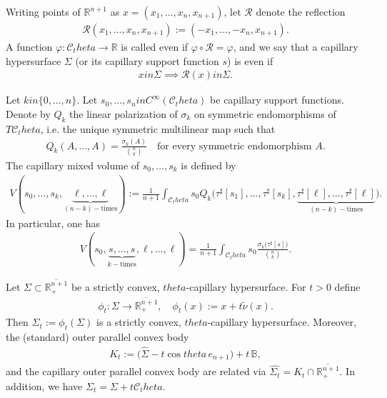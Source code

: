 \documentclass[12pt]{amsart}
\def\theta{theta}%
\def\in{in }%
\numberwithin{equation}{section}
\newcommand{\wh}{\widehat}
\newcommand{\ov}{\overline}
\newcommand{\bbR}{\mathbb{R}}
\newcommand{\bbB}{\mathbb{B}}
\newcommand{\Rn}{\mathbb{R}^{n+1}}
\newcommand{\8}{\infty}
\newcommand{\Si}{\Sigma}
\newcommand{\cC}{\mathcal{C}}
\newcommand{\cR}{\mathcal{R}}
\newcommand{\eq}[1]{\begin{equation}\begin{alignedat}{2}#1\end{alignedat}\end{equation}}
\newcommand{\Cth}{\cC_\theta}
\begin{document}
Writing points of $\Rn$ as $x=(x_1,\dots,x_n,x_{n+1})$, let $\cR$ denote the reflection
\eq{
  \cR(x_1,\dots,x_n,x_{n+1})
  := (-x_1,\dots,-x_n,x_{n+1}).
}
A function $\varphi:\Cth\to\bbR$ is called even if $\varphi\circ\cR=\varphi$, and we say that a capillary hypersurface $\Si$ (or its capillary support function $s$) is even if
\eq{
  x\in\Si
  \implies
   \cR(x)\in\Si.
}

\begin{defn}\label{def:mixed-volume}
Let $k\in\{0,\dots,n\}$. Let $s_0,\dots,s_{n}\in C^\infty(\Cth)$ be capillary
support functions. Denote by $Q_k$ the linear polarization of
$\sigma_k$ on symmetric endomorphisms of $T\Cth$, i.e. the unique symmetric
multilinear map such that
\eq{
  Q_k(A,\dots,A)=\frac{\sigma_k(A)}{\binom{n}{k}}
  \quad\text{for every symmetric endomorphism }A.
}
The capillary mixed volume of $s_0,\dots,s_{k}$ is defined by
\eq{\label{def:Vk}
  V(s_0,\dots,s_{k},\underbrace{\ell,\ldots,\ell}_{(n-k)-\text{times}})
  := \frac{1}{n+1}
     \int_{\Cth}
       s_0
       Q_k\bigl(
         \tau^\sharp[s_1],\dots,\tau^\sharp[s_{k}],
         \underbrace{\tau^\sharp[\ell],\dots,\tau^\sharp[\ell]}_{(n-k)-\text{times}}
       \bigr).
}
In particular, one has
\eq{\label{eq:Vk-special}
  V(s_0,\underbrace{s,\dots,s}_{k- \text{times}},\ell,\dots,\ell)
  = \frac{1}{n+1}\int_{\Cth} s_0\frac{\sigma_k\bigl(\tau^\sharp[s]\bigr)}{\binom{n}{k}}.
}
\end{defn}

\begin{thm}\label{lem:tilde-nu-parallel body}
Let $\Sigma\subset\ov{\bbR^{n+1}_+}$ be a strictly convex, $\theta$-capillary hypersurface.
For $t>0$ define
\eq{ \phi_t:\Sigma\to\ov{\bbR^{n+1}_+},\quad \phi_t(x):=x+t \tilde\nu(x).
}
Then $\Sigma_t:=\phi_t(\Sigma)$ is a strictly convex, $\theta$-capillary hypersurface. Moreover, the (standard) outer parallel convex body
\eq{
  K_t:=\bigl(\widehat{\Sigma}-t\cos\theta\,e_{n+1}\bigr)+t\,\bbB,
}
and the capillary outer parallel convex body are related via $\wh{\Si_t}=K_t\cap \ov{\bbR^{n+1}_+}$.
In addition, we have $\Si_t=\Si+t\Cth$.
\end{thm}
\end{document}

